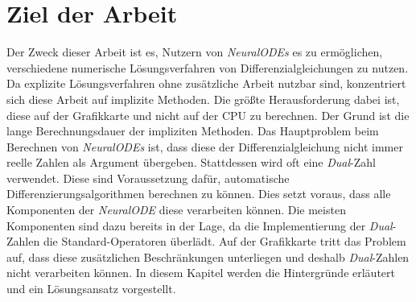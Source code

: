 
\section{Ziel der Arbeit} \label{sec:ziel_der_arbeit}

Der Zweck dieser Arbeit ist es, Nutzern von \textit{NeuralODEs} \cite{neuralode} es zu ermöglichen, 
verschiedene numerische Lösungsverfahren von Differenzialgleichungen zu nutzen.
Da explizite Lösungsverfahren ohne zusätzliche Arbeit nutzbar sind,
konzentriert sich diese Arbeit auf implizite Methoden.
Die größte Herausforderung dabei ist, 
diese auf der Grafikkarte und nicht auf der CPU zu berechnen.
Der Grund ist die lange Berechnungsdauer der impliziten Methoden.
Das Hauptproblem beim Berechnen von \textit{NeuralODEs} ist, dass diese der Differenzialgleichung nicht immer reelle Zahlen als Argument übergeben.
Stattdessen wird oft eine \textit{Dual}-Zahl verwendet.
Diese sind Voraussetzung dafür, 
automatische Differenzierungsalgorithmen berechnen zu können.
Dies setzt voraus, dass alle Komponenten der \textit{NeuralODE}\cite{neuralode} diese verarbeiten können.
Die meisten Komponenten sind dazu bereits in der Lage, 
da die Implementierung der \textit{Dual}-Zahlen
die Standard-Operatoren überlädt.
Auf der Grafikkarte tritt das Problem auf, dass diese
zusätzlichen Beschränkungen unterliegen 
und deshalb \textit{Dual}-Zahlen nicht verarbeiten können.
In diesem Kapitel werden die Hintergründe erläutert und ein Lösungsansatz vorgestellt.


